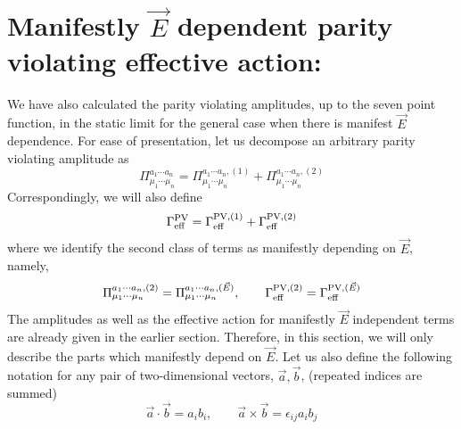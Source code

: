 \documentclass[a4paper,12pt]{article}
\begin{document}
\section{Manifestly $\vec{E}$ dependent parity violating effective
action:} 

We have also calculated the parity violating amplitudes, up to the
seven point function, in the static limit for the general case when
there is manifest
$\vec{E}$ dependence. For ease of presentation, let us decompose an
arbitrary parity violating amplitude as
\begin{equation}
\Pi_{\mu_{1}\cdots \mu_{n}}^{a_{1}\cdots a_{n}} = \Pi_{\mu_{1}\cdots
  \mu_{n}}^{a_{1}\cdots a_{n}, (1)} +
  \Pi_{\mu_{1}\cdots\mu_{n}}^{a_{1}\cdots a_{n},(2)}\label{19}
\end{equation}
Correspondingly, we will also define
\begin{equation}
\Gamma_{\rm eff}^{\rm PV} = \Gamma_{\rm eff}^{{\rm PV}, (1)} +
\Gamma_{\rm eff}^{{\rm PV}, (2)}\label{20}
\end{equation}
where we identify the second class of terms as manifestly depending on
$\vec{E}$, namely,
\begin{equation}
\Pi_{\mu_{1}\cdots \mu_{n}}^{a_{1}\cdots a_{n}, (2)} =
\Pi_{\mu_{1}\cdots \mu_{n}}^{a_{1}\cdots a_{n}, (\vec{E})},\qquad
\Gamma_{\rm eff}^{{\rm PV}, (2)} = \Gamma_{\rm eff}^{{\rm PV},
(\vec{E})}
\end{equation} 
The amplitudes as well as the effective action for manifestly
$\vec{E}$ independent  terms are
already given in the earlier section. Therefore, in this section, we
will only describe the parts which manifestly depend on $\vec{E}$. Let
us  also define the following notation for any pair of
two-dimensional
vectors, $\vec{a},\vec{b}$, (repeated indices are summed)
\begin{equation}
\vec{a}\cdot \vec{b} = a_{i}b_{i},\qquad \vec{a}\times \vec{b} =
\epsilon_{ij}a_{i}b_{j}\label{21}
\end{equation}
\end{document}

